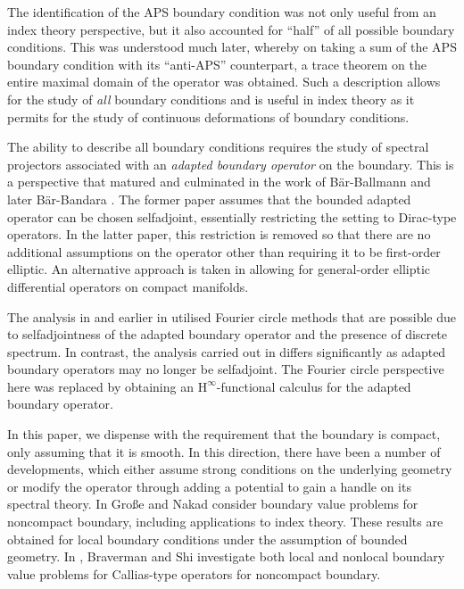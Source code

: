 \documentclass[a4paper,10pt,reqno]{amsart}
\newcommand{\Hinfty}{$\mathrm{H}^\infty$}
\theoremstyle{definition}
\begin{document}
The identification of the APS boundary condition was not only useful from an index theory perspective, but  it also accounted for ``half'' of all possible boundary conditions.
This was understood much later, whereby on taking a sum of the APS boundary condition with its ``anti-APS'' counterpart, a trace theorem on the entire maximal domain of the operator was obtained.
Such a description allows for the study of \emph{all} boundary conditions and is useful in index theory as it permits for the study of continuous deformations  of boundary conditions.

The ability to describe all boundary conditions requires the study of spectral projectors associated with an \emph{adapted boundary operator} on the boundary.
This is a perspective that matured and  culminated in the work of Bär-Ballmann \cite{BB12} and later Bär-Bandara \cite{BBan}.
The former paper assumes that the bounded adapted operator can be chosen selfadjoint, essentially restricting the setting to Dirac-type operators.
In the latter paper, this restriction is removed so that there are  no additional assumptions on the operator other than requiring it to be  first-order elliptic.
An alternative approach is taken in \cite{BGS} allowing for general-order elliptic differential operators on compact manifolds. 

The analysis in \cite{BB12} and earlier in \cite{APS1} utilised Fourier circle methods that are possible due to selfadjointness of the adapted boundary operator and the presence of discrete spectrum.
In contrast, the analysis carried out in \cite{BBan}  differs significantly as adapted boundary operators may no longer be selfadjoint.
The Fourier circle perspective here was replaced by obtaining an \Hinfty-functional calculus for the adapted boundary operator.

In this paper, we dispense with the requirement that the boundary is compact, only assuming that it is smooth.
In this direction, there have been a number of developments, which either assume strong conditions on the underlying geometry or modify the operator through adding a potential to gain a handle on its spectral theory.
In \cite{GN} Große and Nakad consider boundary value problems for noncompact boundary, including applications to index theory.
These results are obtained for local boundary conditions under the assumption of bounded geometry.
In \cites{BS0, BS1, BS2, Shi}, Braverman and Shi investigate both local and nonlocal boundary value problems for Callias-type operators for noncompact boundary.
\end{document}
